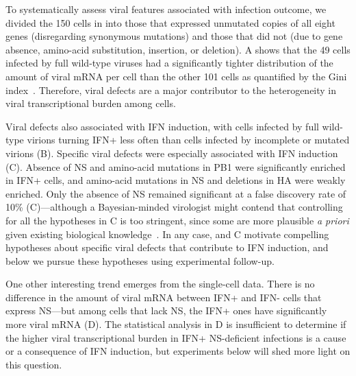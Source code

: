 \documentclass[9pt,lineno]{elife}
\begin{document}
\begin{figure}
\begin{fullwidth}
\label{figdata:mutations}

\end{fullwidth}
\end{figure}

To systematically assess viral features associated with infection outcome, we divided the 150 cells in  into those that expressed unmutated copies of all eight genes (disregarding synonymous mutations) and those that did not (due to gene absence, amino-acid substitution, insertion, or deletion).
A shows that the 49 cells infected by full wild-type viruses had a significantly tighter distribution of the amount of viral mRNA per cell than the other 101 cells as quantified by the Gini index~\citep{gini1921measurement}.
Therefore, viral defects are a major contributor to the heterogeneity in viral transcriptional burden among cells.

Viral defects also associated with IFN induction, with cells infected by full wild-type virions turning IFN+ less often than cells infected by incomplete or mutated virions (B).
Specific viral defects were especially associated with IFN induction (C).
Absence of NS and amino-acid mutations in PB1 were significantly enriched in IFN+ cells, and amino-acid mutations in NS and deletions in HA were weakly enriched.
Only the absence of NS remained significant at a false discovery rate of 10\% (C)---although a Bayesian-minded virologist might contend that controlling for all the hypotheses in C is too stringent, since some are more plausible \textit{a priori} given existing biological knowledge~\citep[e.g.,][]{killip2017single, velthuis2018mini, wu2014high}.
In any case,  and C motivate compelling hypotheses about specific viral defects that contribute to IFN induction, and below we pursue these hypotheses using experimental follow-up. 

One other interesting trend emerges from the single-cell data.
There is no difference in the amount of viral mRNA between IFN+ and IFN- cells that express NS---but among cells that lack NS, the IFN+ ones have significantly more viral mRNA (D).
The statistical analysis in D is insufficient to determine if the higher viral transcriptional burden in IFN+ NS-deficient infections is a cause or a consequence of IFN induction, but experiments below will shed more light on this question.
\end{document}
